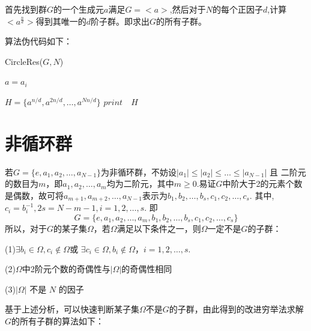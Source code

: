 \documentclass[11pt, a4paper, oneside，UTF8]{article}
\begin{document}
首先找到群$G$的一个生成元$a$满足$G=<a>$,然后对于$N$的每个正因子$d$,计算$<a^{\frac{n}{d}}>$得到其唯一的$d$阶子群。即求出$G$的所有子群。

算法伪代码如下：

\begin{algorithm}
	\caption{CircleRes($G,N$)}
	\begin{algorithmic}[1]
				\STATE $a=a_{i}$
			\ENDIF
		\ENDFOR

				\STATE $H=\{a^{n/d},a^{2n/d},\ldots,a^{Nn/d}\}$
				\STATE $print\quad H$
			\ENDIF
		\ENDFOR
	\end{algorithmic}
\end{algorithm}





\section{非循环群}

若$G=\{e,a_{1},a_{2},\ldots ,a_{N-1}\}$为非循环群，不妨设$|a_{1}|\leq |a_{2}|\leq \ldots \leq |a_{N-1}|$ 且 二阶元的数目为$m$，即$a_{1},a_{2},\ldots ,a_{m}$均为二阶元，其中$m\geq 0.$易证$G$中阶大于2的元素个数是偶数，故可将$a_{m+1},a_{m+2},\ldots ,a_{N-1}$表示为$b_{1},b_{2},\ldots ,b_{s},c_{1},c_{2},\ldots ,c_{s}.$ 其中,$c_{i}=b_{i}^{-1}, 2s=N-m-1, i=1,2,\dots ,s.$
即$$ G=\{e,a_{1},a_{2},\ldots ,a_{m},b_{1},b_{2},\ldots ,b_{s},c_{1},c_{2},\ldots ,c_{s}\} $$
所以，对于$G$的某子集$\Omega$，若$\Omega$满足以下条件之一，则$\Omega$一定不是$G$的子群：

(1)$\exists b_{i} \in \Omega,c_{i} \notin \Omega$或
   $\exists c_{i} \in \Omega,b_{i} \notin \Omega$，$i=1,2,\ldots,s.$

(2)$\Omega$中2阶元个数的奇偶性与$|\Omega|$的奇偶性相同

(3)$|\Omega|$ 不是 $N$ 的因子



基于上述分析，可以快速判断某子集$\Omega$不是$G$的子群，由此得到的改进穷举法求解$G$的所有子群的算法如下：
\end{document}
